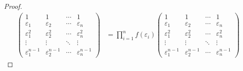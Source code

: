 \documentclass[class=nhvh-linear-algebra,crop=false]{standalone}
\begin{document}
\begin{proof}
\begin{align*}
		\begin{pmatrix}
			1                     & 1                     & \cdots & 1                     \\
			\varepsilon_{1}       & \varepsilon_{2}       & \cdots & \varepsilon_{n}       \\
			\varepsilon_{1}^{2}   & \varepsilon_{2}^{2}   & \cdots & \varepsilon_{n}^{2}   \\
			\vdots                & \vdots                & \ddots & \vdots                \\
			\varepsilon_{1}^{n-1} & \varepsilon_{2}^{n-1} & \cdots & \varepsilon_{n}^{n-1}
		\end{pmatrix}
		 & = \prod^{n}_{i=1}f(\varepsilon_{i})
		\begin{pmatrix}
			1                     & 1                     & \cdots & 1                     \\
			\varepsilon_{1}       & \varepsilon_{2}       & \cdots & \varepsilon_{n}       \\
			\varepsilon_{1}^{2}   & \varepsilon_{2}^{2}   & \cdots & \varepsilon_{n}^{2}   \\
			\vdots                & \vdots                & \ddots & \vdots                \\
			\varepsilon_{1}^{n-1} & \varepsilon_{2}^{n-1} & \cdots & \varepsilon_{n}^{n-1}
		\end{pmatrix}
	\end{align*}
	\endgroup{}


\end{proof}
\end{document}
